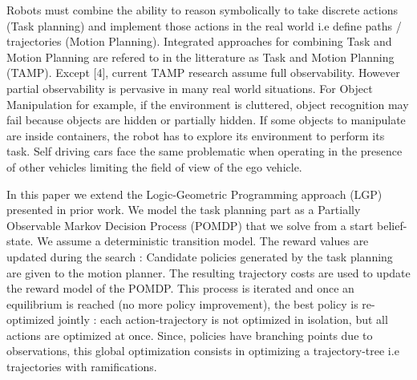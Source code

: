 \documentclass[conference]{IEEEtran}
\begin{document}
Robots must combine the ability to reason symbolically to take discrete actions (Task planning) and implement those actions in the real world i.e define paths / trajectories (Motion Planning). Integrated approaches for combining Task and Motion Planning are refered to in the litterature as  Task and Motion Planning (TAMP). 
Except [4], current TAMP research assume full observability. However partial observability is pervasive in many real world situations. For Object Manipulation for example, if the environment is cluttered, object recognition may fail because objects are hidden or partially hidden. If some objects to manipulate
are inside containers, the robot has to explore its environment to perform its task. Self driving cars face the same problematic when operating in the presence of other vehicles limiting the field of view of the ego vehicle.

In this paper we extend the Logic-Geometric Programming approach (LGP) presented in prior work. We model the task planning part as a Partially Observable Markov Decision Process (POMDP) that we solve from a start belief-state. We assume a deterministic transition model. The reward values are updated during the search : Candidate policies generated by the task planning are given to the motion planner. The resulting trajectory costs are used to update the reward model of the POMDP. This process is iterated and once an equilibrium is reached (no more policy improvement), the best policy is re-optimized jointly : each action-trajectory is not optimized in isolation, but all actions are optimized at once. Since, policies have branching points due to observations, this global optimization consists in optimizing a trajectory-tree i.e trajectories with ramifications.
\end{document}
